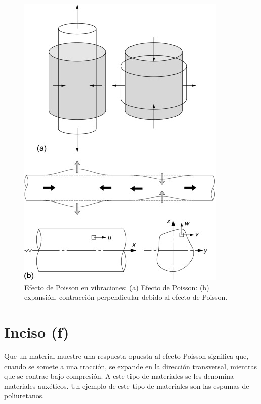 \documentclass[../main.tex]{subfiles}
\begin{document}
\begin{problema}[3]
	\begin{figure}[htb]
		\centering
		\includegraphics[scale=0.6]{figs/poisson.jpg}
		\caption{Efecto de Poisson en vibraciones: (a) Efecto de Poisson: (b) expansión, contracción perpendicular debido al efecto de Poisson.\cite{graffChapter6Power2023}}
		\label{fig:poisson-effect}
	\end{figure}

	\section{Inciso (f)}

	Que un material muestre una respuesta opuesta al efecto Poisson significa que,
	cuando se somete a una tracción, se expande en la dirección transversal, mientras
	que se contrae bajo compresión. A este tipo de materiales se les denomina
	materiales auxéticos.
	Un ejemplo de este tipo de materiales son las espumas de poliuretanos.\cite{LiAuxeticPUFoam2016}

\end{problema}
\end{document}
